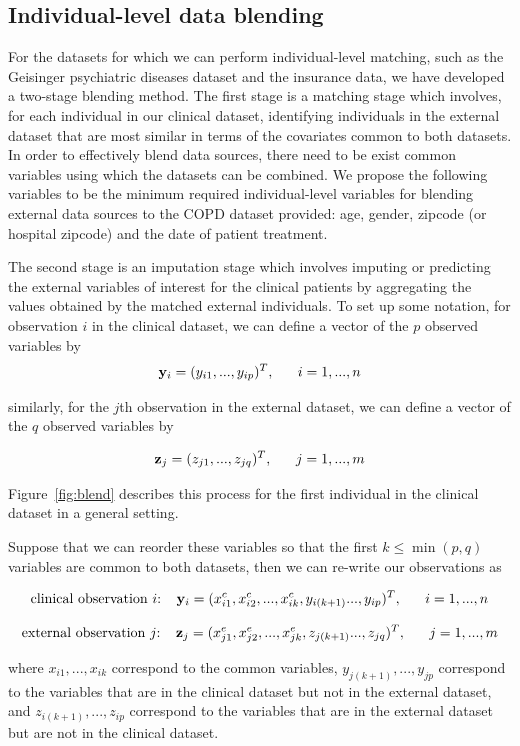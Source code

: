 \documentclass{article}
\begin{document}
\subsection{Individual-level data blending}

For the datasets for which we can perform individual-level matching, such as the Geisinger psychiatric diseases dataset and the insurance data, we have developed a two-stage blending method. The first stage is a matching stage which involves, for each individual in our clinical dataset, identifying individuals in the external dataset that are most similar in terms of the covariates common to both datasets. In order to effectively blend data sources, there need to be exist common variables using which the datasets can be combined. We propose the following variables to be the minimum required individual-level variables for blending external data sources to the COPD dataset provided: age, gender, zipcode (or hospital zipcode) and the date of patient treatment.

The second stage is an imputation stage which involves imputing or predicting the external variables of interest for the clinical patients by aggregating the values obtained by the matched external individuals. To set up some notation, for observation $i$ in the clinical dataset, we can define a vector of the $p$ observed variables by
$${\bf y}_i = (y_{i1}, ..., y_{ip})^T, ~~~~~ i = 1, ..., n$$

similarly, for the $j$th observation in the external dataset, we can define a vector of the $q$ observed variables by

$${\bf z}_j = (z_{j1}, ..., z_{jq})^T, ~~~~~ j = 1, ..., m$$

Figure~\ref{fig:blend} describes this process for the first individual in the clinical dataset in a general setting.

Suppose that we can reorder these variables so that the first $k \leq \min(p,q)$ variables are common to both datasets, then we can re-write our observations as

$$\text{clinical observation $i$: } ~~{\bf y}_i = (x^c_{i1}, x^c_{i2}, ..., x^c_{ik}, y_{i(k+1)} ..., y_{ip})^T, ~~~~~ i = 1, ..., n$$



$$\text{external observation $j$: }~~{\bf z}_j = (x^e_{j1}, x^e_{j2}, ..., x^e_{jk}, z_{j(k+1)} ..., z_{jq})^T, ~~~~~ j = 1, ..., m$$


where $x_{i1}, ..., x_{ik}$ correspond to the common variables, $y_{j(k+1)}, ..., y_{jp}$ correspond to the variables that are in the clinical dataset but not in the external dataset, and $z_{i(k+1)}, ..., z_{ip}$ correspond to the variables that are in the external dataset but are not in the clinical dataset.
\end{document}
